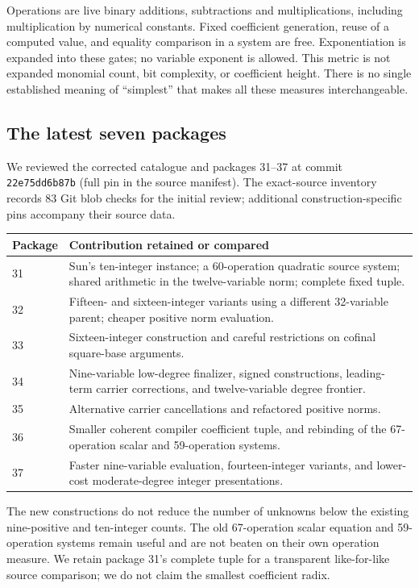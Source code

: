 \documentclass[11pt]{article}
\begin{document}
Operations are live binary additions, subtractions and multiplications,
including multiplication by numerical constants. Fixed coefficient generation,
reuse of a computed value, and equality comparison in a system are free.
Exponentiation is expanded into these gates; no variable exponent is allowed.
This metric is not expanded monomial count, bit complexity, or coefficient
height. There is no single established meaning of ``simplest'' that makes all
these measures interchangeable.

\subsection{The latest seven packages}

We reviewed the corrected catalogue and packages 31--37 at commit
\texttt{22e75dd6b87b} (full pin in the source manifest).
The exact-source inventory records 83 Git blob checks for the initial review;
additional construction-specific pins accompany their source data.

\begin{longtable}{@{}p{}p{}@{}}
\toprule Package & Contribution retained or compared\\\midrule\endhead
31 & Sun's ten-integer instance; a 60-operation quadratic source system;
shared arithmetic in the twelve-variable norm; complete fixed tuple.\\
32 & Fifteen- and sixteen-integer variants using a different 32-variable
parent; cheaper positive norm evaluation.\\
33 & Sixteen-integer construction and careful restrictions on cofinal
square-base arguments.\\
34 & Nine-variable low-degree finalizer, signed constructions, leading-term
carrier corrections, and twelve-variable degree frontier.\\
35 & Alternative carrier cancellations and refactored positive norms.\\
36 & Smaller coherent compiler coefficient tuple, and rebinding of the
67-operation scalar and 59-operation systems.\\
37 & Faster nine-variable evaluation, fourteen-integer variants, and lower-cost
moderate-degree integer presentations.\\\bottomrule
\end{longtable}

The new constructions do not reduce the number of unknowns below the existing
nine-positive and ten-integer counts. The old 67-operation scalar equation and
59-operation systems remain useful and are not beaten on their own operation
measure. We retain package 31's complete tuple for a transparent like-for-like
source comparison; we do not claim the smallest coefficient radix.
\end{document}
